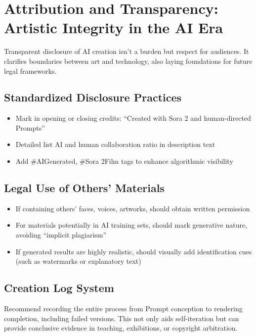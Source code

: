 \section{Attribution and Transparency: Artistic Integrity in the AI Era}
\label{sec:attribution-transparency}

Transparent disclosure of AI creation isn't a burden but respect for audiences. It clarifies boundaries between art and technology, also laying foundations for future legal frameworks.

\subsection{Standardized Disclosure Practices}

\begin{itemize}
\item Mark in opening or closing credits: ``Created with Sora 2 and human-directed Prompts''
\item Detailed list AI and human collaboration ratio in description text
\item Add \#AIGenerated, \#Sora 2Film tags to enhance algorithmic visibility
\end{itemize}

\subsection{Legal Use of Others' Materials}

\begin{itemize}
\item If containing others' faces, voices, artworks, should obtain written permission
\item For materials potentially in AI training sets, should mark generative nature, avoiding ``implicit plagiarism''
\item If generated results are highly realistic, should visually add identification cues (such as watermarks or explanatory text)
\end{itemize}

\subsection{Creation Log System}

Recommend recording the entire process from Prompt conception to rendering completion, including failed versions. This not only aids self-iteration but can provide conclusive evidence in teaching, exhibitions, or copyright arbitration.

